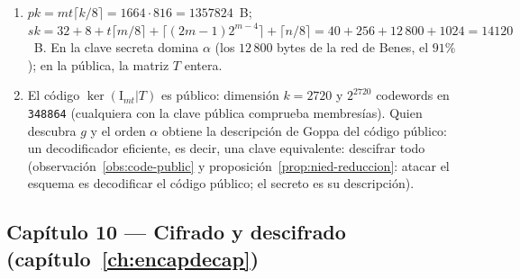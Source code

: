 \documentclass[11pt,a4paper,oneside]{report}
\begin{document}
\begin{enumerate}[leftmargin=1.9em,itemsep=4pt]
        a cambio de $\le2$ bits de tensión en la reducción y una
        ventana de intercambios de tamaño fijo (tiempo constante).
  \item $pk=mt\lceil k/8\rceil=1664\cdot816=\num{1357824}$~B;
        $sk=32+8+t\lceil m/8\rceil+\lceil(2m-1)2^{m-4}\rceil
        +\lceil n/8\rceil=40+256+12\,800+1024=\num{14120}$~B.
        En la clave secreta domina $\alpha$ (los $12\,800$ bytes de
        la red de Benes, el $91\%$); en la pública, la matriz $T$
        entera.
  \item El código $\ker(\mathrm{I}_{mt}|T)$ es público: dimensión
        $k=2720$ y $2^{2720}$ codewords en \texttt{348864}
        (cualquiera con la clave pública comprueba membresías). Quien
        descubra $g$ y el orden $\alpha$ obtiene la descripción de
        Goppa del código público: un decodificador eficiente, es
        decir, una clave equivalente: descifrar todo
        (observación~\ref{obs:code-public} y
        proposición~\ref{prop:nied-reduccion}: atacar el esquema es
        decodificar el código público; el secreto es su
        descripción).
\end{enumerate}

\subsection*{Capítulo 10 --- Cifrado y descifrado
(capítulo~\ref{ch:encapdecap})}
\end{document}
